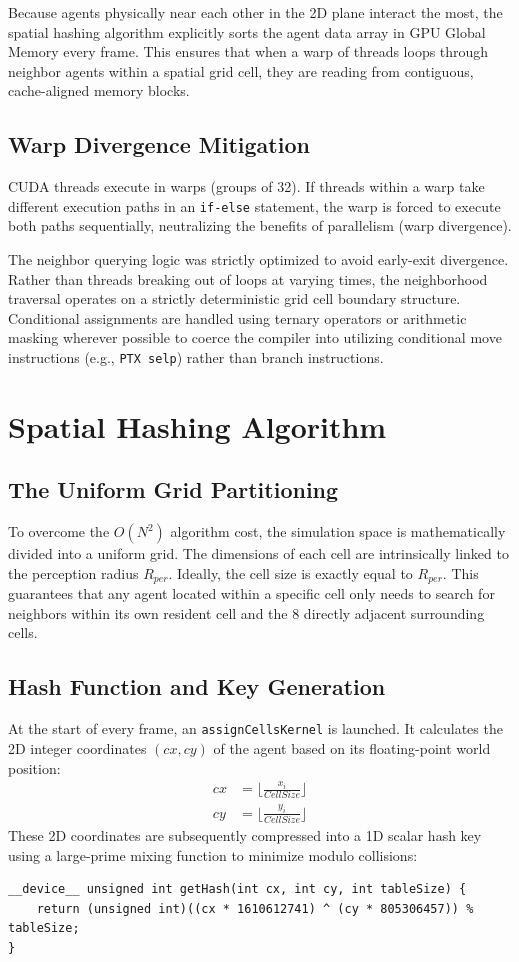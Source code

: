 \documentclass[12pt,a4paper]{report}
\begin{document}
Because agents physically near each other in the 2D plane interact the most, the spatial hashing algorithm explicitly sorts the agent data array in GPU Global Memory every frame. This ensures that when a warp of threads loops through neighbor agents within a spatial grid cell, they are reading from contiguous, cache-aligned memory blocks. 

\section{Warp Divergence Mitigation}
CUDA threads execute in warps (groups of 32). If threads within a warp take different execution paths in an \texttt{if-else} statement, the warp is forced to execute both paths sequentially, neutralizing the benefits of parallelism (warp divergence).

The neighbor querying logic was strictly optimized to avoid early-exit divergence. Rather than threads breaking out of loops at varying times, the neighborhood traversal operates on a strictly deterministic grid cell boundary structure. Conditional assignments are handled using ternary operators or arithmetic masking wherever possible to coerce the compiler into utilizing conditional move instructions (e.g., \texttt{PTX selp}) rather than branch instructions.

\chapter{Spatial Hashing Algorithm}

\section{The Uniform Grid Partitioning}
To overcome the $O(N^2)$ algorithm cost, the simulation space is mathematically divided into a uniform grid. The dimensions of each cell are intrinsically linked to the perception radius $R_{per}$. Ideally, the cell size is exactly equal to $R_{per}$. This guarantees that any agent located within a specific cell only needs to search for neighbors within its own resident cell and the 8 directly adjacent surrounding cells.

\section{Hash Function and Key Generation}
At the start of every frame, an \texttt{assignCellsKernel} is launched. It calculates the 2D integer coordinates $(cx, cy)$ of the agent based on its floating-point world position:
\begin{align}
cx &= \lfloor \frac{x_i}{CellSize} \rfloor \\
cy &= \lfloor \frac{y_i}{CellSize} \rfloor
\end{align}
These 2D coordinates are subsequently compressed into a 1D scalar hash key using a large-prime mixing function to minimize modulo collisions:
\begin{lstlisting}[caption=Spatial Hash Function]
__device__ unsigned int getHash(int cx, int cy, int tableSize) {
    return (unsigned int)((cx * 1610612741) ^ (cy * 805306457)) % tableSize;
}
\end{lstlisting}
\end{document}
